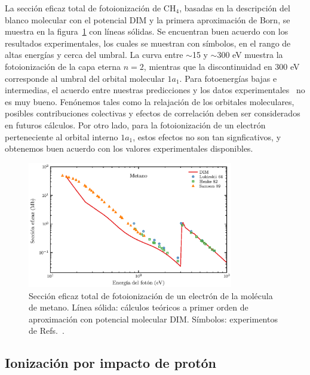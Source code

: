 La sección eficaz total de fotoionización de CH$_4$, basadas en la 
descripción del blanco molecular con el potencial DIM y la primera 
aproximación de Born, se muestra en la figura~\ref{fig:photoch4} con 
líneas sólidas. Se encuentran buen acuerdo con los resultados 
experimentales, los cuales se muestran con símbolos, en el rango de
altas energías y cerca del umbral. La curva entre $\sim$15 y 
$\sim$300 eV muestra la fotoionización de la capa eterna $n=2$, mientras
que la discontinuidad en 300 eV corresponde al umbral del orbital 
molecular $1a_1$. Para fotoenergías bajas e intermedias, el acuerdo entre 
nuestras predicciones y los datos 
experimentales~\cite{Lukirskii1964,Henke1982,Samson1989} no es muy bueno.
Fenónemos tales como la relajación de los orbitales moleculares, posibles
contribuciones colectivas y efectos de correlación deben ser considerados 
en futuros cálculos. Por otro lado, para la fotoionización de un electrón
perteneciente al orbital interno $1a_1$, estos efectos no son tan 
signficativos, y obtenemos buen acuerdo con los valores experimentales
disponibles.

\begin{figure}[t]
\centering
 \includegraphics[width=0.8\textwidth]{figures/dim/ch4_fotoDIM.eps}
\caption[Fotoionización de metano.]
{Sección eficaz total de fotoionización de un electrón de la
molécula de metano. Línea sólida: cálculos teóricos a primer orden de 
aproximación con potencial molecular DIM. Símbolos: experimentos de 
Refs.~\cite{Lukirskii1964,Henke1982,Samson1989}.}
\label{fig:photoch4}
\end{figure}


\subsection{Ionización por impacto de protón}

